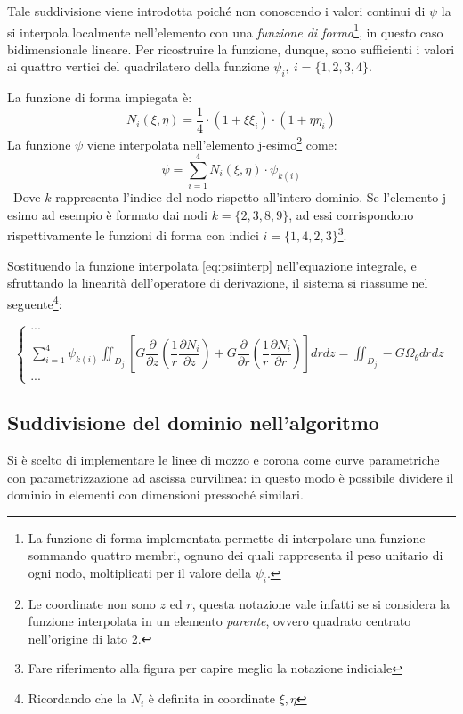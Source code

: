\documentclass{tufte-handout}
\newcommand{\de}[2]{\dfrac{\partial #1}{\partial #2}}
\begin{document}
Tale suddivisione viene introdotta poiché non conoscendo i valori continui di $\psi$ la si interpola localmente nell'elemento con una \emph{funzione di forma}\footnote{La funzione di forma implementata permette di interpolare una funzione sommando quattro membri, ognuno dei quali rappresenta il peso unitario di ogni nodo, moltiplicati per il valore della $\psi_i$.}, in questo caso bidimensionale lineare. Per ricostruire la funzione, dunque, sono sufficienti i valori ai quattro vertici del quadrilatero della funzione $\psi_i,\ i = \{1,2,3,4\}$.

La funzione di forma impiegata è:
\begin{equation}
    N_i (\xi,\eta) = \frac{1}{4} \cdot (1+\xi \xi_i) \cdot (1+\eta \eta_i)
\end{equation}
La funzione $\psi$ viene interpolata nell'elemento j-esimo\footnote{Le coordinate non sono $z$ ed $r$, questa notazione vale infatti se si considera la funzione interpolata in un elemento \emph{parente}, ovvero quadrato centrato nell'origine di lato 2.} come:
\begin{equation}
    \psi = \sum_{i=1}^4 N_i (\xi,\eta)\cdot \psi_{k(i)}
    \label{eq:psiinterp}
\end{equation}\
Dove $k$ rappresenta l'indice del nodo rispetto all'intero dominio. Se l'elemento j-esimo ad esempio è formato dai nodi $k = \{2, 3, 8, 9\}$, ad essi corrispondono rispettivamente le funzioni di forma con indici $i = \{1, 4, 2, 3\}$\footnote{Fare riferimento alla figura per capire meglio la notazione indiciale}.

Sostituendo la funzione interpolata \ref{eq:psiinterp} nell'equazione integrale, e sfruttando la linearità dell'operatore di derivazione, il sistema si riassume nel seguente\footnote{Ricordando che la $N_i$ è definita in coordinate $\xi, \eta$}:
\begin{fullwidth}
\[\begin{cases}
    ...\\
     \sum_{i=1}^4 \psi_{k(i)}
     \iint_{D_j} \left[
        G\de{}{z}\left(\dfrac{1}{r}\de{N_i}{z}\right)
     +  G\de{}{r}\left(\dfrac{1}{r}\de{N_i}{r}\right)\right]
     dr dz
    = \iint_{D_j} -G\Omega_\theta dr dz \\
    ...
\end{cases}
\]
\end{fullwidth}

\subsection{Suddivisione del dominio nell'algoritmo}
Si è scelto di implementare le linee di mozzo e corona come curve parametriche con parametrizzazione ad ascissa curvilinea: in questo modo è possibile dividere il dominio in elementi con dimensioni pressoché similari.
\end{document}

